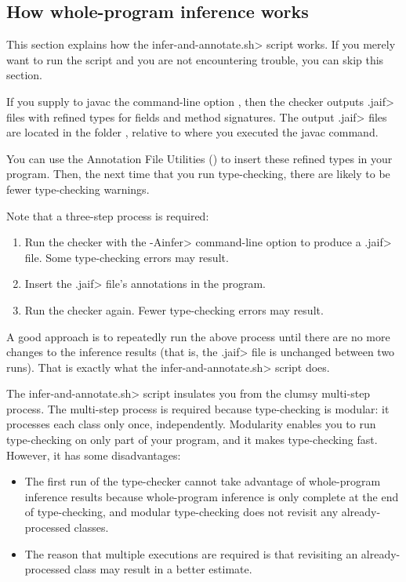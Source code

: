 \subsection{How whole-program inference works\label{how-whole-program-inference-works}}

This section explains how the \<infer-and-annotate.sh> script works.  If you
merely want to run the script and you are not encountering trouble, you can
skip this section.

If you
supply to javac the command-line option , then the
checker outputs \<.jaif> files with refined types for fields and method signatures.
The output \<.jaif> files are located in the folder ,
relative to where you executed the javac command.

You can use the Annotation File Utilities
() to
insert these refined types in your program.  Then, the next time that you
run type-checking, there are likely to be fewer type-checking warnings.

Note that a three-step process is required:
\begin{enumerate}
\item Run the checker with the \<-Ainfer> command-line option to
  produce a \<.jaif> file.  Some type-checking errors may result.
\item Insert the \<.jaif> file's annotations in the program.
\item Run the checker again.  Fewer type-checking errors may result.
\end{enumerate}
\noindent
A good approach is to repeatedly run the above process until there are no
more changes to the inference results (that is, the \<.jaif> file is
unchanged between two runs).  That is exactly what the
\<infer-and-annotate.sh> script does.

The \<infer-and-annotate.sh> script insulates you from the
clumsy multi-step process.  The multi-step process
is required because type-checking is modular:
it processes each class only once, independently.  Modularity enables you
to run type-checking on only part of your program, and
it makes type-checking fast.  However, it has some disadvantages:
\begin{itemize}
\item
  The first run of the type-checker cannot take advantage
  of whole-program inference results because whole-program inference is only complete at the
  end of type-checking, and modular type-checking does not revisit any
  already-processed classes.
\item
  The reason that multiple executions are required is that revisiting an
  already-processed class may result in a better estimate.
\end{itemize}



